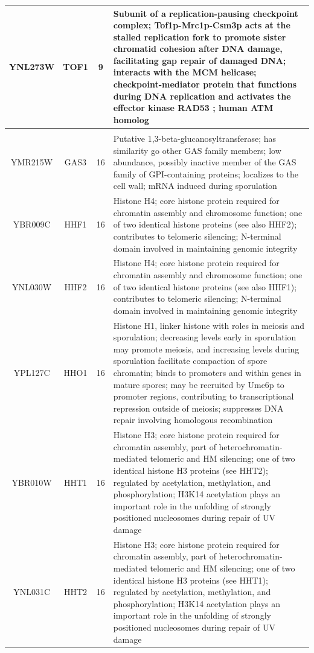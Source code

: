 \documentclass[]{article}
\begin{document}
\begin{longtable}{@{\extracolsep{3pt}} cccp{85mm}}
YNL273W & TOF1 & 9 & Subunit of a replication-pausing checkpoint complex; Tof1p-Mrc1p-Csm3p acts at the stalled replication fork to promote sister chromatid cohesion after DNA damage, facilitating gap repair of damaged DNA; interacts with the MCM helicase; checkpoint-mediator protein that functions during DNA replication and activates the effector kinase RAD53 \citep{bando2009csm3}; human ATM homolog \citep{lao2018yeast}  \\   \hline \\ [-1.8ex] 
YMR215W & GAS3 & 16 & Putative 1,3-beta-glucanosyltransferase; has similarity go other GAS family members; low abundance, possibly inactive member of the GAS family of GPI-containing proteins; localizes to the cell wall; mRNA induced during sporulation \\ 
YBR009C & HHF1 & 16 & Histone H4; core histone protein required for chromatin assembly and chromosome function; one of two identical histone proteins (see also HHF2); contributes to telomeric silencing; N-terminal domain involved in maintaining genomic integrity \\ 
YNL030W & HHF2 & 16 & Histone H4; core histone protein required for chromatin assembly and chromosome function; one of two identical histone proteins (see also HHF1); contributes to telomeric silencing; N-terminal domain involved in maintaining genomic integrity \\ 
YPL127C & HHO1 & 16 & Histone H1, linker histone with roles in meiosis and sporulation; decreasing levels early in sporulation may promote meiosis, and increasing levels during sporulation facilitate compaction of spore chromatin; binds to promoters and within genes in mature spores; may be recruited by Ume6p to promoter regions, contributing to transcriptional repression outside of meiosis; suppresses DNA repair involving homologous recombination \\ 
YBR010W & HHT1 & 16 & Histone H3; core histone protein required for chromatin assembly, part of heterochromatin-mediated telomeric and HM silencing; one of two identical histone H3 proteins (see HHT2); regulated by acetylation, methylation, and phosphorylation; H3K14 acetylation plays an important role in the unfolding of strongly positioned nucleosomes during repair of UV damage \\ 
YNL031C & HHT2 & 16 & Histone H3; core histone protein required for chromatin assembly, part of heterochromatin-mediated telomeric and HM silencing; one of two identical histone H3 proteins (see HHT1); regulated by acetylation, methylation, and phosphorylation; H3K14 acetylation plays an important role in the unfolding of strongly positioned nucleosomes during repair of UV damage \\ 

\end{longtable}
\end{document}
